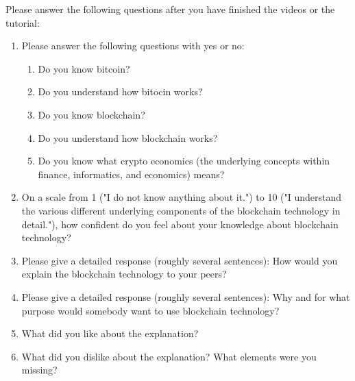 Please answer the following questions after you have finished the videos or the tutorial:
\begin{enumerate}
\setcounter{enumi}{\value{xy}}
    \item Please answer the following questions with yes or no:
    \begin{enumerate}
        \item Do you know bitcoin?
        \item Do you understand how bitocin works?
        \item Do you know blockchain?
        \item Do you understand how blockchain works?
        \item Do you know what crypto economics (the underlying concepts within finance, informatics, and economics) means?
    \end{enumerate}
    \item On a scale from 1 ("I do not know anything about it.") to 10 ("I understand the various different underlying components of the blockchain technology in detail."), how confident do you feel about your knowledge about blockchain technology?
    \item Please give a detailed response (roughly several sentences): How would you explain the blockchain technology to your peers?
    \item Please give a detailed response (roughly several sentences): Why and for what purpose would somebody want to use blockchain technology?
    \item What did you like about the explanation?
    \item What did you dislike about the explanation? What elements were you missing?
\end{enumerate}

 \label{anhang:ResponsesQuestionnaire}


